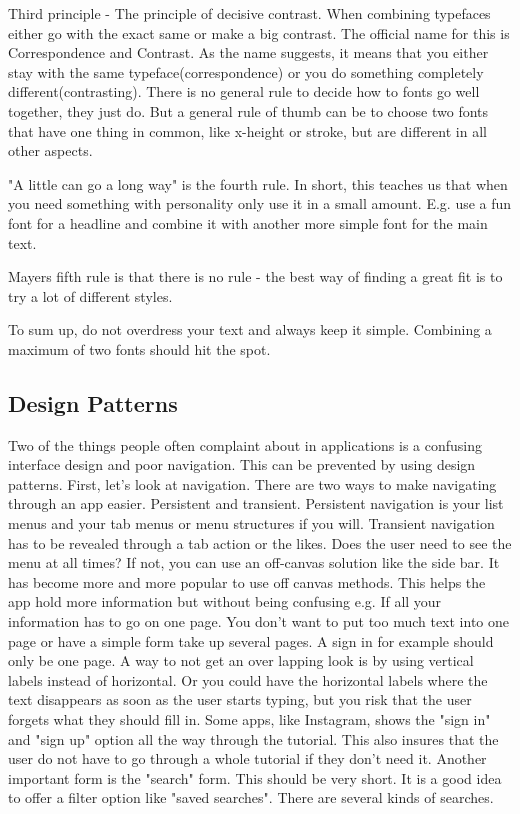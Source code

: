 Third principle - The principle of decisive contrast. When combining typefaces either go with the exact same or make a big contrast. The official name for this is Correspondence and Contrast. As the name suggests, it means that you either stay with the same typeface(correspondence) or you do something completely different(contrasting).\cite{Font}
There is no general rule to decide how to fonts go well together, they just do. But a general rule of thumb can be to choose two fonts that have one thing in common, like x-height or stroke, but are different in all other aspects. 

"A little can go a long way" is the fourth rule. In short, this teaches us that when you need something with personality only use it in a small amount. E.g. use a fun font for a headline and combine it with another more simple font for the main text. 

Mayers fifth rule is that there is no rule - the best way of finding a great fit is to try a lot of different styles. \cite{Font}

To sum up, do not overdress your text and always keep it simple. Combining a maximum of two fonts should hit the spot.\cite{TypeComb}

\subsection{Design Patterns}

Two of the things people often complaint about in applications is a confusing interface design and poor navigation. \cite{Pattern} This can be prevented by using design patterns. 
First, let's look at navigation. There are two ways to make navigating through an app easier. Persistent and transient. Persistent navigation is your list menus and your tab menus or menu structures if you will. Transient navigation has to be revealed through a tab action or the likes.\cite{Pattern}
Does the user need to see the menu at all times? If not, you can use an off-canvas solution like the side bar. 
It has become more and more popular to use off canvas methods. \cite{Pattern} This helps the app hold more information but without being confusing e.g. If all your information has to go on one page. 
You don't want to put too much text into one page or have a simple form take up several pages. A sign in for example should only be one page. A way to not get an over lapping look is by using vertical labels instead of horizontal. \cite{Pattern} Or you could have the horizontal labels where the text disappears as soon as the user starts typing, but you risk that the user forgets what they should fill in.\cite{Pattern} 
Some apps, like Instagram, shows the "sign in" and "sign up" option all the way through the tutorial. This also insures that the user do not have to go through a whole tutorial if they don’t need it. 
Another important form is the "search" form. This should be very short. It is a good idea to offer a filter option like "saved searches". There are several kinds of searches. 

